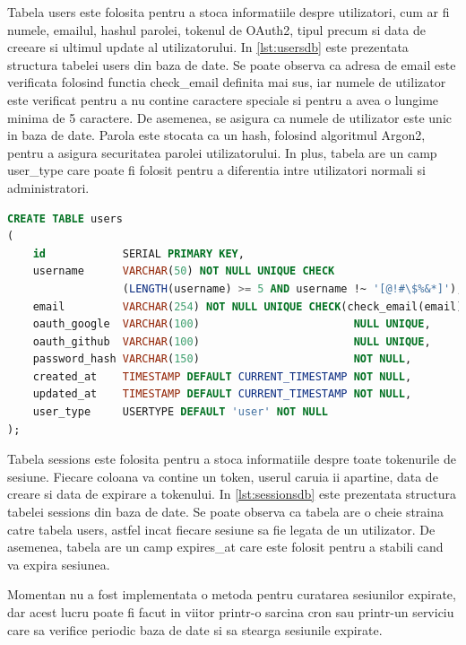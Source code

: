 \documentclass[titlepage,12pt]{article}
\DeclareRobustCommand{\code}[1]{{\ttfamily\small #1}}
\begin{document}
Tabela \code{users} este folosita pentru a stoca informatiile despre utilizatori, cum ar fi numele, emailul, hashul parolei, tokenul de \code{OAuth2}, tipul precum si data de creeare si ultimul update al utilizatorului. In \cref{lst:usersdb} este prezentata structura tabelei \code{users} din baza de date.
Se poate observa ca adresa de email este verificata folosind functia \code{check\_email} definita mai sus, iar numele de utilizator este verificat pentru a nu contine caractere speciale si pentru a avea o lungime minima de 5 caractere. De asemenea, se asigura ca numele de utilizator este unic in baza de date. Parola este stocata ca un hash, folosind algoritmul \code{Argon2}, pentru a asigura securitatea parolei utilizatorului. In plus, tabela are un camp \code{user\_type} care poate fi folosit pentru a diferentia intre utilizatori normali si administratori.
\begin{lstlisting}[language=SQL,caption={Tabelele \code{users} din baza de date},label={lst:usersdb}]
CREATE TABLE users
(
    id            SERIAL PRIMARY KEY,
    username      VARCHAR(50) NOT NULL UNIQUE CHECK
                  (LENGTH(username) >= 5 AND username !~ '[@!#\$%&*]'),
    email         VARCHAR(254) NOT NULL UNIQUE CHECK(check_email(email)),
    oauth_google  VARCHAR(100)                        NULL UNIQUE,
    oauth_github  VARCHAR(100)                        NULL UNIQUE,
    password_hash VARCHAR(150)                        NOT NULL,
    created_at    TIMESTAMP DEFAULT CURRENT_TIMESTAMP NOT NULL,
    updated_at    TIMESTAMP DEFAULT CURRENT_TIMESTAMP NOT NULL,
    user_type     USERTYPE DEFAULT 'user' NOT NULL
);
\end{lstlisting}

Tabela \code{sessions} este folosita pentru a stoca informatiile despre toate tokenurile de sesiune. Fiecare coloana va contine un token, userul caruia ii apartine, data de creare si data de expirare a tokenului. In \cref{lst:sessionsdb} este prezentata structura tabelei \code{sessions} din baza de date.
Se poate observa ca tabela are o cheie straina catre tabela \code{users}, astfel incat fiecare sesiune sa fie legata de un utilizator. De asemenea, tabela are un camp \code{expires\_at} care este folosit pentru a stabili cand va expira sesiunea.

Momentan nu a fost implementata o metoda pentru curatarea sesiunilor expirate, dar acest lucru poate fi facut in viitor printr-o sarcina \code{cron} sau printr-un serviciu care sa verifice periodic baza de date si sa stearga sesiunile expirate.
\end{document}
